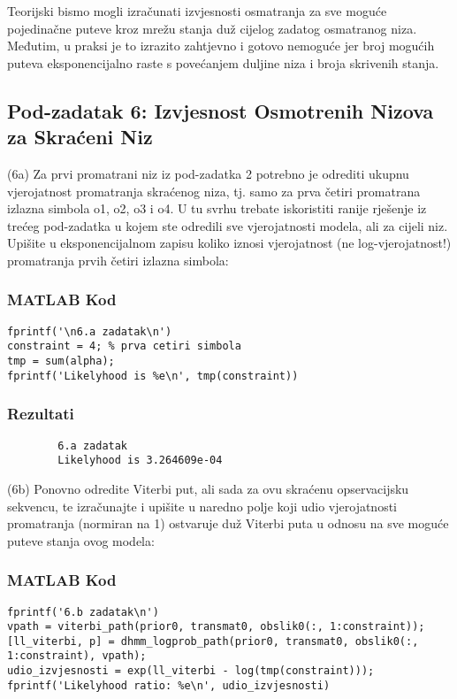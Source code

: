 \documentclass[12pt]{article}
\begin{document}
	Teorijski bismo mogli izračunati izvjesnosti osmatranja za sve moguće pojedinačne puteve kroz mrežu stanja duž cijelog zadatog osmatranog niza. Međutim, u praksi je to izrazito zahtjevno i gotovo nemoguće jer broj mogućih puteva eksponencijalno raste s povećanjem duljine niza i broja skrivenih stanja.
	
	\subsection{Pod-zadatak 6: Izvjesnost Osmotrenih Nizova za Skraćeni Niz}
	(6a) Za prvi promatrani niz iz pod-zadatka 2 potrebno je odrediti ukupnu vjerojatnost promatranja skraćenog niza, tj. samo za prva četiri promatrana izlazna simbola o1, o2, o3 i o4. U tu svrhu trebate iskoristiti ranije rješenje iz trećeg pod-zadatka u kojem ste odredili sve vjerojatnosti modela, ali za cijeli niz. Upišite u eksponencijalnom zapisu koliko iznosi vjerojatnost (ne log-vjerojatnost!) promatranja prvih četiri izlazna simbola:
	
	\subsubsection*{MATLAB Kod}
	\begin{lstlisting}
fprintf('\n6.a zadatak\n')          
constraint = 4; % prva cetiri simbola
tmp = sum(alpha);
fprintf('Likelyhood is %e\n', tmp(constraint))
	\end{lstlisting}
	
	\subsubsection*{Rezultati}
	\begin{verbatim}
		6.a zadatak
		Likelyhood is 3.264609e-04
	\end{verbatim}
	
	(6b) Ponovno odredite Viterbi put, ali sada za ovu skraćenu opservacijsku sekvencu, te izračunajte i upišite u naredno polje koji udio vjerojatnosti promatranja (normiran na 1) ostvaruje duž Viterbi puta u odnosu na sve moguće puteve stanja ovog modela:
	
	\subsubsection*{MATLAB Kod}
	\begin{lstlisting}
fprintf('6.b zadatak\n')
vpath = viterbi_path(prior0, transmat0, obslik0(:, 1:constraint));
[ll_viterbi, p] = dhmm_logprob_path(prior0, transmat0, obslik0(:, 1:constraint), vpath);
udio_izvjesnosti = exp(ll_viterbi - log(tmp(constraint)));
fprintf('Likelyhood ratio: %e\n', udio_izvjesnosti)
	\end{lstlisting}
	
\end{document}
